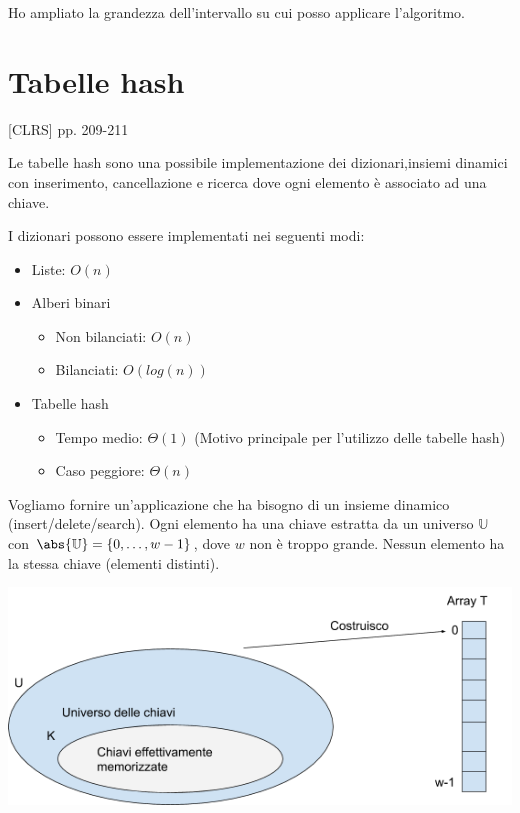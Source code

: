 \documentclass[11pt,a4paper,twoside,openright]{book}
\providecommand{\tightlist}{\setlength{\itemsep}{0pt}\setlength{\parskip}{0pt}}
\begin{document}
{Ho ampliato la grandezza dell'intervallo su cui posso applicare l'algoritmo.}

\section{Tabelle hash}

{{[}CLRS{]} pp. 209-211}

{Le tabelle hash sono una possibile implementazione dei dizionari,insiemi dinamici con inserimento, cancellazione e ricerca dove ogni elemento è associato ad una chiave.}

{I dizionari possono essere implementati nei seguenti modi:}

\begin{itemize}
\tightlist
\item
  {Liste: $O(n)$}
\item
	{Alberi binari}
	
\begin{itemize}
\tightlist
\item
  	{Non bilanciati: $O(n)$}
\item
  	{Bilanciati: $O(log(n))$}
\end{itemize}

\item
  	{Tabelle hash}
  	
\begin{itemize}
\tightlist
\item
	{Tempo medio: $\Theta(1)$ (Motivo principale per l'utilizzo delle tabelle hash)}
\item
	{Caso peggiore: $\Theta(n)$}
\end{itemize}

\end{itemize}

{Vogliamo fornire un'applicazione che ha bisogno di un insieme dinamico (insert/delete/search). Ogni elemento ha una chiave estratta da un universo $\mathbb{U}$ con $\abs{\mathbb{U}} = \{0,\ldots,w-1\}$, dove $w$ non è troppo grande. Nessun elemento ha la stessa chiave (elementi distinti). }

{\includegraphics{images/image521.png}}
\end{document}
